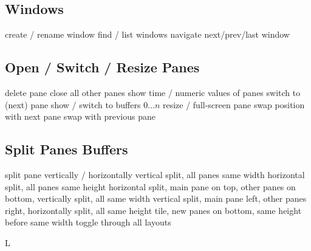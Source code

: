 \subsection{Windows}{}
	{create / rename window}
	{find / list windows}
	{navigate next/prev/last window}

\subsection{Open / Switch / Resize Panes}{}
	{delete pane}
	{close all other panes}
	{show time / numeric values of panes}
	{switch to (next) pane}
	{show / switch to buffers $0 \ldots n$}
	{resize / full-screen pane}
	{swap position with next pane}
	{swap with previous pane}

\subsection{Split Panes \or Buffers}{}
	{split pane vertically / horizontally}
	{vertical split, all panes same width}
	{horizontal split, all panes same height}
	{horizontal split, main pane on top, other panes on bottom, vertically split, all same width}
	{vertical split, main pane left, other panes right, horizontally split, all same height}
	{tile, new panes on bottom, same height before same width}
	{toggle through all layouts}

\copyrightnotice

\supereject
\if L\lr \else\null\vfill\eject\fi
\bye

